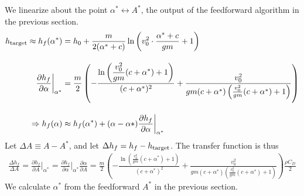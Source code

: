 \documentclass{amsdtx}
\begin{document}
\noindent We linearize about the point $\alpha^*\leftrightarrow A^*$, the output of the feedforward algorithm in the previous section.
\begin{align}
	h_{\rm target} \approx h_f(\alpha^*) &= h_0 + \frac{m}{2(\alpha^*+c)}\ln\left(v_0^2\cdot \frac{\alpha^*+c}{gm}+1\right) \\[1em]
	\frac{\partial h_f}{\partial \alpha}\biggr|_{\alpha^*} &= \frac m2\left(-\frac{\displaystyle\ln\left(\frac{v_0^2}{gm}(c+\alpha^*)+1\right)}{(c+\alpha^*)^2} + \frac{v_0^2}{gm(c+\alpha^*)\left(\frac{v_0^2}{gm}(c+\alpha^*)+1\right)}\right)\\[1em]
	\Rightarrow h_f(\alpha) &\approx h_f(\alpha^*) + (\alpha-\alpha*)\frac{\partial h_f}{\partial \alpha}\biggr|_{\alpha^*}
\end{align} 
Let $\Delta A \equiv A-A^*$, and let $\Delta h_f = h_f-h_{\rm target}$. The transfer function is thus
\begin{align}
	\boxed{\frac{\Delta h_f}{\Delta A} = \frac{\partial h_f}{\partial A}\biggr|_{\alpha^*} = \frac{\partial h_f}{\partial \alpha}\biggr|_{\alpha^*}\frac{\partial \alpha}{\partial A} = \frac m2\left(-\frac{\displaystyle\ln\left(\frac{v_0^2}{gm}(c+\alpha^*)+1\right)}{(c+\alpha^*)^2} + \frac{v_0^2}{gm(c+\alpha^*)\left(\frac{v_0^2}{gm}(c+\alpha^*)+1\right)}\right)\frac{\rho C_D}{2}}
\end{align}
We calculate $\alpha^*$ from the feedforward $A^*$ in the previous section. 
\end{document}
